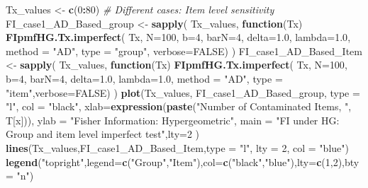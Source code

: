 \documentclass[
]{article}
\newenvironment{Shaded}{\begin{snugshade}}{\end{snugshade}}
\newcommand{\AttributeTok}[1]{\textcolor[rgb]{0.13,0.29,0.53}{#1}}
\newcommand{\CommentTok}[1]{\textcolor[rgb]{0.56,0.35,0.01}{\textit{#1}}}
\newcommand{\ConstantTok}[1]{\textcolor[rgb]{0.56,0.35,0.01}{#1}}
\newcommand{\ControlFlowTok}[1]{\textcolor[rgb]{0.13,0.29,0.53}{\textbf{#1}}}
\newcommand{\DecValTok}[1]{\textcolor[rgb]{0.00,0.00,0.81}{#1}}
\newcommand{\FloatTok}[1]{\textcolor[rgb]{0.00,0.00,0.81}{#1}}
\newcommand{\FunctionTok}[1]{\textcolor[rgb]{0.13,0.29,0.53}{\textbf{#1}}}
\newcommand{\NormalTok}[1]{#1}
\newcommand{\OtherTok}[1]{\textcolor[rgb]{0.56,0.35,0.01}{#1}}
\newcommand{\SpecialCharTok}[1]{\textcolor[rgb]{0.81,0.36,0.00}{\textbf{#1}}}
\newcommand{\StringTok}[1]{\textcolor[rgb]{0.31,0.60,0.02}{#1}}
\begin{document}
\begin{Shaded}
\begin{Highlighting}[]
\NormalTok{Tx\_values }\OtherTok{\textless{}{-}} \FunctionTok{c}\NormalTok{(}\DecValTok{0}\SpecialCharTok{:}\DecValTok{80}\NormalTok{)}
\CommentTok{\# Different cases: Item level sensitivity}
\NormalTok{FI\_case1\_AD\_Based\_group }\OtherTok{\textless{}{-}} \FunctionTok{sapply}\NormalTok{(}
\NormalTok{Tx\_values, }\ControlFlowTok{function}\NormalTok{(Tx) }\FunctionTok{FIpmfHG.Tx.imperfect}\NormalTok{(}
\NormalTok{Tx, }\AttributeTok{N=}\DecValTok{100}\NormalTok{, }\AttributeTok{b=}\DecValTok{4}\NormalTok{, }\AttributeTok{barN=}\DecValTok{4}\NormalTok{, }
\AttributeTok{delta=}\FloatTok{1.0}\NormalTok{, }\AttributeTok{lambda=}\FloatTok{1.0}\NormalTok{, }
\AttributeTok{method =} \StringTok{"AD"}\NormalTok{, }\AttributeTok{type =} \StringTok{"group"}\NormalTok{,}
\AttributeTok{verbose=}\ConstantTok{FALSE}\NormalTok{)}
\NormalTok{)}
\NormalTok{FI\_case1\_AD\_Based\_Item }\OtherTok{\textless{}{-}} \FunctionTok{sapply}\NormalTok{(}
\NormalTok{Tx\_values, }\ControlFlowTok{function}\NormalTok{(Tx) }\FunctionTok{FIpmfHG.Tx.imperfect}\NormalTok{(}
\NormalTok{Tx, }\AttributeTok{N=}\DecValTok{100}\NormalTok{, }\AttributeTok{b=}\DecValTok{4}\NormalTok{, }\AttributeTok{barN=}\DecValTok{4}\NormalTok{, }
\AttributeTok{delta=}\FloatTok{1.0}\NormalTok{, }\AttributeTok{lambda=}\FloatTok{1.0}\NormalTok{, }
\AttributeTok{method =} \StringTok{"AD"}\NormalTok{, }\AttributeTok{type =} \StringTok{"item"}\NormalTok{,}\AttributeTok{verbose=}\ConstantTok{FALSE}\NormalTok{)}
\NormalTok{)}
\FunctionTok{plot}\NormalTok{(Tx\_values, FI\_case1\_AD\_Based\_group, }
\AttributeTok{type =} \StringTok{"l"}\NormalTok{, }\AttributeTok{col =} \StringTok{"black"}\NormalTok{, }
\AttributeTok{xlab=}\FunctionTok{expression}\NormalTok{(}\FunctionTok{paste}\NormalTok{(}\StringTok{"Number of Contaminated Items, "}\NormalTok{, T[x])),}
\AttributeTok{ylab =} \StringTok{"Fisher Information: Hypergeometric"}\NormalTok{, }
\AttributeTok{main =} \StringTok{"FI under HG: Group and item level imperfect test"}\NormalTok{,}\AttributeTok{lty=}\DecValTok{2}
\NormalTok{)}
\FunctionTok{lines}\NormalTok{(Tx\_values,FI\_case1\_AD\_Based\_Item,}\AttributeTok{type =} \StringTok{"l"}\NormalTok{, }\AttributeTok{lty =} \DecValTok{2}\NormalTok{, }\AttributeTok{col =} \StringTok{"blue"}\NormalTok{)}
\FunctionTok{legend}\NormalTok{(}\StringTok{"topright"}\NormalTok{,}\AttributeTok{legend=}\FunctionTok{c}\NormalTok{(}\StringTok{"Group"}\NormalTok{,}\StringTok{"Item"}\NormalTok{),}\AttributeTok{col=}\FunctionTok{c}\NormalTok{(}\StringTok{"black"}\NormalTok{,}\StringTok{"blue"}\NormalTok{),}\AttributeTok{lty=}\FunctionTok{c}\NormalTok{(}\DecValTok{1}\NormalTok{,}\DecValTok{2}\NormalTok{),}\AttributeTok{bty =} \StringTok{"n"}\NormalTok{)}
\end{Highlighting}
\end{Shaded}
\end{document}
